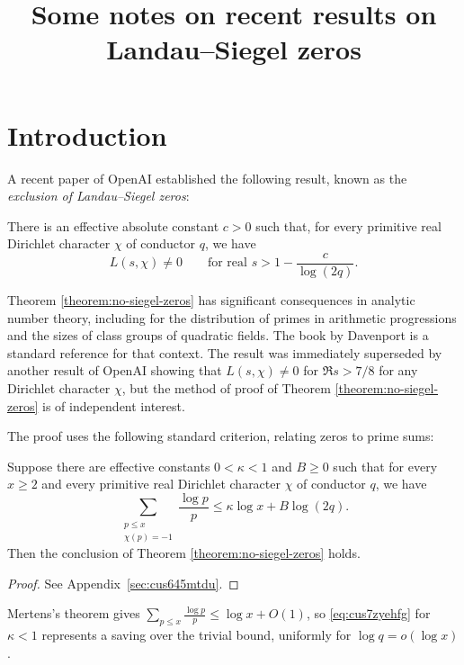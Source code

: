 \documentclass[reqno]{amsart} 
\begin{document}
\title{Some notes on recent results on Landau--Siegel zeros}

\maketitle

\setcounter{tocdepth}{1} \tableofcontents

\section{Introduction}\label{sec:cus71nf8oy}

A recent paper of OpenAI \cite{OAI:Uniform-exclusion-of-Landau-Siegel-zeros-October-1-2026} established the following result, known as the \emph{exclusion of Landau--Siegel zeros}:
\begin{theorem}\label{theorem:no-siegel-zeros}
  There is an effective absolute constant $c>0$ such that, for every primitive real Dirichlet character $\chi$ of conductor $q$, we have
  \begin{equation*}
    L(s,\chi)\neq0
    \qquad\text{for real }s>1-\frac c{\log(2q)}.
  \end{equation*}
\end{theorem}
Theorem \ref{theorem:no-siegel-zeros} has significant consequences in analytic number theory, including for the distribution of primes in arithmetic progressions and the sizes of class groups of quadratic fields.  The book by Davenport \cite{Dav80} is a standard reference for that context.  The result was immediately superseded by another result of OpenAI \cite{OpenAI2026QuasiRHSeptember30} showing that $L(s, \chi) \neq 0$ for $\Re s > 7/8$ for any Dirichlet character $\chi$, but the method of proof of Theorem \ref{theorem:no-siegel-zeros} is of independent interest.

The proof uses the following standard criterion, relating zeros to prime sums:
\begin{lemma}\label{lemma:prime-saving-zeros}
  Suppose there are effective constants $0 < \kappa < 1$ and $B \geq 0$ such that for every $x \geq 2$ and every primitive real Dirichlet character $\chi$ of conductor $q$, we have
  \begin{equation}\label{eq:cus7zyehfg}
    \sum_{
      \substack{
        p \leq x  \\
        \chi(p) = - 1        
      }
    }
    \frac{\log p}{p}
    \leq \kappa \log x + B \log(2 q).
  \end{equation}
  Then the conclusion of Theorem \ref{theorem:no-siegel-zeros} holds.
\end{lemma}
\begin{proof}
  See Appendix~\ref{sec:cus645mtdu}.
\end{proof}
Mertens's theorem gives $\sum_{p \leq x} \frac{\log p}{p} \leq \log x + O(1)$, so \eqref{eq:cus7zyehfg} for $\kappa < 1$ represents a saving over the trivial bound, uniformly for $\log q = o(\log x)$.
\end{document}
